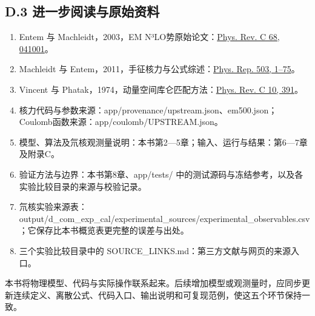 \documentclass[UTF8,a4paper,zihao=5,fontset=fandol]{ctexart}
\begin{document}
\subsection*{D.3 进一步阅读与原始资料}
\begin{enumerate}[start=1]
\item Entem 与 Machleidt，2003，EM N³LO势原始论文：\href{https://doi.org/10.1103/PhysRevC.68.041001}{Phys. Rev. C 68, 041001}。


\item Machleidt 与 Entem，2011，手征核力与公式综述：\href{https://doi.org/10.1016/j.physrep.2011.02.001}{Phys. Rep. 503, 1–75}。


\item Vincent 与 Phatak，1974，动量空间库仑匹配方法：\href{https://doi.org/10.1103/PhysRevC.10.391}{Phys. Rev. C 10, 391}。


\item 核力代码与参数来源：{\ttfamily\small app/\allowbreak{}provenance/\allowbreak{}upstream.\allowbreak{}json}、{\ttfamily\small em500.\allowbreak{}json}；Coulomb函数来源：{\ttfamily\small app/\allowbreak{}coulomb/\allowbreak{}UPSTREAM.\allowbreak{}json}。


\item 模型、算法及氘核观测量说明：本书第2—5章；输入、运行与结果：第6—7章及附录C。


\item 验证方法与边界：本书第8章、{\ttfamily\small app/\allowbreak{}tests/\allowbreak{}} 中的测试源码与冻结参考，以及各实验比较目录的来源与校验记录。


\item 氘核实验来源表：{\ttfamily\small output/\allowbreak{}d\_\allowbreak{}com\_\allowbreak{}exp\_\allowbreak{}cal/\allowbreak{}experimental\_\allowbreak{}sources/\allowbreak{}experimental\_\allowbreak{}observables.\allowbreak{}csv}；它保存比本书概览表更完整的误差与出处。


\item 三个实验比较目录中的 {\ttfamily\small SOURCE\_\allowbreak{}LINKS.\allowbreak{}md}：第三方文献与网页的来源入口。


\end{enumerate}
本书将物理模型、代码与实际操作联系起来。后续增加模型或观测量时，应同步更新连续定义、离散公式、代码入口、输出说明和可复现范例，使这五个环节保持一致。
\end{document}

